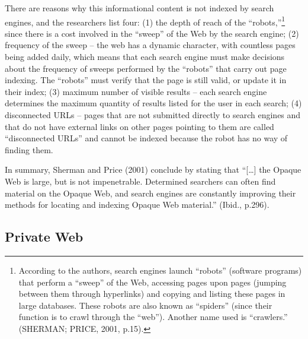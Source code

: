 There are reasons why this informational content is not indexed by search engines, and the researchers list four: (1) the depth of reach of the ``robots,''\footnote{According to the authors, search engines launch ``robots'' (software programs) that perform a ``sweep'' of the Web, accessing pages upon pages (jumping between them through hyperlinks) and copying and listing these pages in large databases. These robots are also known as ``spiders'' (since their function is to crawl through the ``web''). Another name used is ``crawlers.'' (SHERMAN; PRICE, 2001, p.15).} since there is a cost involved in the ``sweep'' of the Web by the search engine; (2) frequency of the sweep -- the web has a dynamic character, with countless pages being added daily, which means that each search engine must make decisions about the frequency of sweeps performed by the ``robots'' that carry out page indexing. The ``robots'' must verify that the page is still valid, or update it in their index; (3) maximum number of visible results -- each search engine determines the maximum quantity of results listed for the user in each search; (4) disconnected URLs -- pages that are not submitted directly to search engines and that do not have external links on other pages pointing to them are called ``disconnected URLs'' and cannot be indexed because the robot has no way of finding them.

In summary, Sherman and Price (2001) conclude by stating that ``{[}\ldots{]} the Opaque Web is large, but is not impenetrable. Determined searchers can often find material on the Opaque Web, and search engines are constantly improving their methods for locating and indexing Opaque Web material.'' (Ibid., p.296).

\subsection{Private Web}

